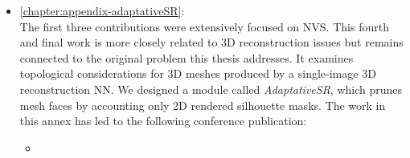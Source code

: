 \begin{itemize}
      \item \autoref{chapter:appendix-adaptativeSR}:  \\
      The first three contributions were extensively focused on \ac{NVS}. This fourth and final work is more closely related to 3D reconstruction issues but remains connected to the original problem this thesis addresses. It examines topological considerations for 3D meshes produced by a single-image 3D reconstruction \ac{NN}. We designed a module called \textit{AdaptativeSR}, which prunes mesh faces by accounting only 2D rendered silhouette masks. The work in this annex has led to the following conference publication:
      \begin{itemize}
            \item {}
      \end{itemize}
\end{itemize}


